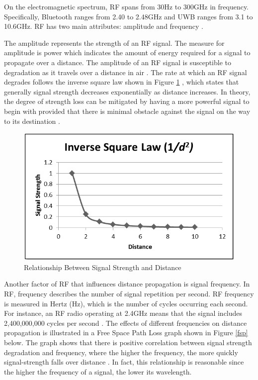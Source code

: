 \medskip
On the electromagnetic spectrum, RF spans from 30Hz to 300GHz in frequency. Specifically, Bluetooth ranges from 2.40 to 2.48GHz and UWB ranges from 3.1 to 10.6GHz. RF has two main attributes: amplitude and frequency \cite{R2-4-1}.

\medskip
The amplitude represents the strength of an RF signal. The measure for amplitude is power which indicates the amount of energy required for a signal to propagate over a distance. The amplitude of an RF signal is susceptible to degradation as it travels over a distance in air \cite{R2-4-1}. The rate at which an RF signal degrades follows the inverse square law shown in Figure \ref{isl} , which states that generally signal strength decreases exponentially as distance increases. In theory, the degree of strength loss can be mitigated by having a more powerful signal to begin with provided that there is minimal obstacle against the signal on the way to its destination \cite{R2-4-2}.

\medskip
\begin{figure}[H]
\centering
    \includegraphics[scale=0.7]{./images/ISL.png}
    \caption{Relationship Between Signal Strength and Distance}
    \label{isl}
\end{figure}


\medskip
Another factor of RF that influences distance propagation is signal frequency. In RF, frequency describes the number of signal repetition per second. RF frequency is measured in Hertz (Hz), which is the number of cycles occurring each second. For instance, an RF radio operating at 2.4GHz means that the signal includes 2,400,000,000 cycles per second \cite{R2-4-1}. The effects of different frequencies on distance propagation is illustrated in a Free Space Path Loss graph shown in Figure \ref{fsp} below. The graph shows that there is positive correlation between signal strength degradation and frequency, where the higher the frequency, the more quickly signal-strength falls over distance \cite{R2-4-2}. In fact, this relationship is reasonable since the higher the frequency of a signal, the lower its wavelength. 

